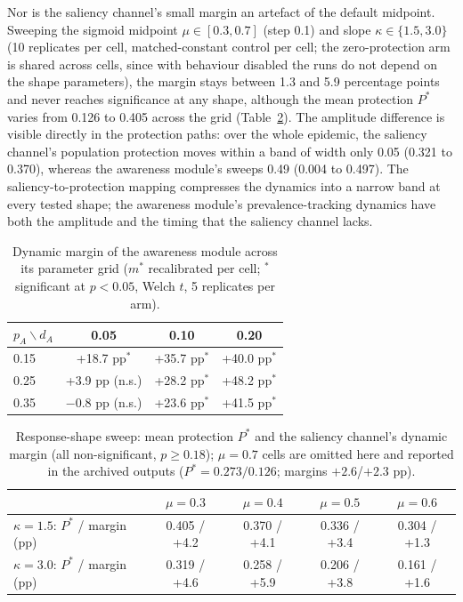 \documentclass[]{interact}
\begin{document}
Nor is the saliency channel's small margin an artefact of the default midpoint. Sweeping the sigmoid midpoint $\mu \in [0.3, 0.7]$ (step 0.1) and slope $\kappa \in \{1.5, 3.0\}$ (10 replicates per cell, matched-constant control per cell; the zero-protection arm is shared across cells, since with behaviour disabled the runs do not depend on the shape parameters), the margin stays between 1.3 and 5.9 percentage points and never reaches significance at any shape, although the mean protection $P^{*}$ varies from 0.126 to 0.405 across the grid (Table~\ref{tab:shape}). The amplitude difference is visible directly in the protection paths: over the whole epidemic, the saliency channel's population protection moves within a band of width only 0.05 (0.321 to 0.370), whereas the awareness module's sweeps 0.49 (0.004 to 0.497). The saliency-to-protection mapping compresses the dynamics into a narrow band at every tested shape; the awareness module's prevalence-tracking dynamics have both the amplitude and the timing that the saliency channel lacks.

\begin{table}[htb]
\centering
\small
\begin{tabular}{lccc}
\hline
$p_A \backslash d_A$ & 0.05 & 0.10 & 0.20 \\
\hline
0.15 & +18.7 pp$^{*}$ & +35.7 pp$^{*}$ & +40.0 pp$^{*}$ \\
0.25 & +3.9 pp (n.s.) & +28.2 pp$^{*}$ & +48.2 pp$^{*}$ \\
0.35 & $-0.8$ pp (n.s.) & +23.6 pp$^{*}$ & +41.5 pp$^{*}$ \\
\hline
\end{tabular}
\caption{Dynamic margin of the awareness module across its parameter grid ($m^{*}$ recalibrated per cell; $^{*}$ significant at $p<0.05$, Welch $t$, 5 replicates per arm).}
\label{tab:awaresens}
\end{table}

\begin{table}[htb]
\centering
\small
\begin{tabular}{lcccc}
\hline
 & $\mu{=}0.3$ & $\mu{=}0.4$ & $\mu{=}0.5$ & $\mu{=}0.6$ \\
\hline
$\kappa{=}1.5$: $P^{*}$ / margin (pp) & 0.405 / +4.2 & 0.370 / +4.1 & 0.336 / +3.4 & 0.304 / +1.3 \\
$\kappa{=}3.0$: $P^{*}$ / margin (pp) & 0.319 / +4.6 & 0.258 / +5.9 & 0.206 / +3.8 & 0.161 / +1.6 \\
\hline
\end{tabular}
\caption{Response-shape sweep: mean protection $P^{*}$ and the saliency channel's dynamic margin (all non-significant, $p \ge 0.18$); $\mu{=}0.7$ cells are omitted here and reported in the archived outputs ($P^{*}{=}0.273/0.126$; margins $+2.6$/$+2.3$ pp).}
\label{tab:shape}
\end{table}
\end{document}
